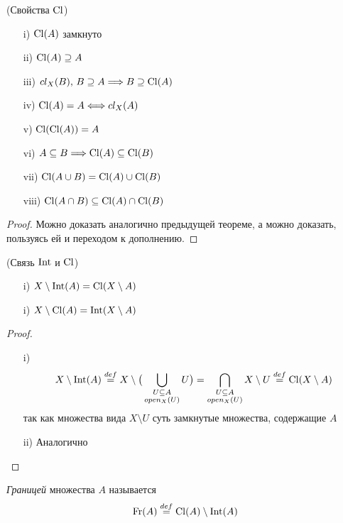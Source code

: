 \begin{theorem}(Свойства $\operatorname{Cl}$)
    \enewline
    \begin{itemize}
        \item[i)] $\operatorname{Cl}(A)$ замкнуто
        \item[ii)] $\operatorname{Cl}(A) \supseteq A$
        \item[iii)] $cl_X(B),\, B \supseteq A \Longrightarrow B \supseteq \operatorname{Cl}(A)$
        \item[iv)] $\operatorname{Cl}(A) = A \Longleftrightarrow cl_X(A)$
        \item[v)] $\operatorname{Cl}(\operatorname{Cl}(A)) = A$
        \item[vi)] $A \subseteq B \Longrightarrow \operatorname{Cl}(A) \subseteq \operatorname{Cl}(B)$
        \item[vii)] $\operatorname{Cl}(A \cup B) = \operatorname{Cl}(A) \cup \operatorname{Cl}(B)$
        \item[viii)] $\operatorname{Cl}(A \cap B) \subseteq \operatorname{Cl}(A) \cap \operatorname{Cl}(B)$
    \end{itemize}
\end{theorem}
\begin{proof}
    Можно доказать аналогично предыдущей теореме, а можно доказать, пользуясь
    ей и переходом к дополнению.
\end{proof}

\begin{theorem}(Связь $\operatorname{Int}$ и $\operatorname{Cl}$)
    \begin{itemize}
        \item[i)] $X \setminus \operatorname{Int}(A) = \operatorname{Cl}(X \setminus A)$
        \item[i)] $X \setminus \operatorname{Cl}(A) = \operatorname{Int}(X \setminus A)$
    \end{itemize}
\end{theorem}
\begin{proof}
    \enewline
    \begin{itemize}
        \item[i)] $$ X \setminus \operatorname{Int}(A) \overset{def}{\underset{}{=}} X \setminus
        \big( \bigcup_{\substack{U \subseteq A \\open_X(U)}}{U} \big) =
        \bigcap_{\substack{U \subseteq A \\open_X(U)}}{X \setminus U} \overset{def}{\underset{}{=}}
        \operatorname{Cl}(X \setminus A) $$
        так как множества вида $X \setminus U$ суть замкнутые множества,
        содержащие $A$
        \item[ii)] Аналогично
    \end{itemize}
\end{proof}

\begin{definition}
    \textit{Границей} множества $A$ называется
\[
    \operatorname{Fr}(A) \overset{def}{\underset{}{=}} \operatorname{Cl}(A) \setminus \operatorname{Int}(A)
\]
\end{definition}

